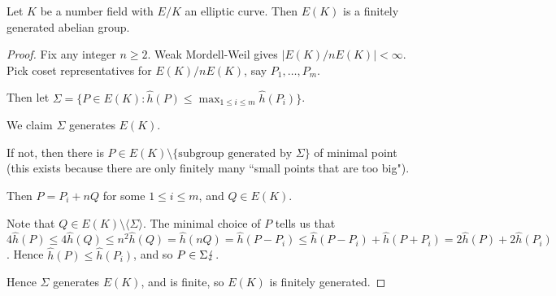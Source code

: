 \documentclass[10pt,a4paper]{article}
\begin{document}
\begin{theorem}
  Let $K$ be a number field with $E/K$ an elliptic curve. Then $E(K)$ is a finitely generated abelian group.
\end{theorem}
\begin{proof}
  Fix any integer $n \geq 2$. Weak Mordell-Weil gives $|E(K)/nE(K)| < \infty$. Pick coset representatives for $E(K)/nE(K)$, say $P_1, \ldots, P_m$.

  Then let $\Sigma = \{P \in E(K) : \hat{h}(P) \leq \max_{1 \leq i \leq m} \hat{h}(P_i)\}$.

  We claim $\Sigma$ generates $E(K)$.

  If not, then there is $P \in E(K) \setminus \{\text{subgroup generated by }\Sigma\}$ of minimal point (this exists because there are only finitely many ``small points that are too big").

  Then $P = P_i + nQ$ for some $1 \leq i \leq m$, and $Q \in E(K)$.

  Note that $Q \in E(K) \setminus \langle\Sigma\rangle$. The minimal choice of $P$ tells us that $4\hat{h}(P) \leq 4\hat{h}(Q) \leq n^2 \hat{h}(Q) = \hat{h}(nQ) = \hat{h}(P-P_i) \leq \hat{h}(P-P_i) + \hat{h}(P+P_i) = 2\hat{h}(P) + 2\hat{h}(P_i)$. Hence $\hat{h}(P) \leq \hat{h}(P_i)$, and so $P \in \Sigma \lightning$.

  Hence $\Sigma$ generates $E(K)$, and is finite, so $E(K)$ is finitely generated.
\end{proof}
\end{document}
